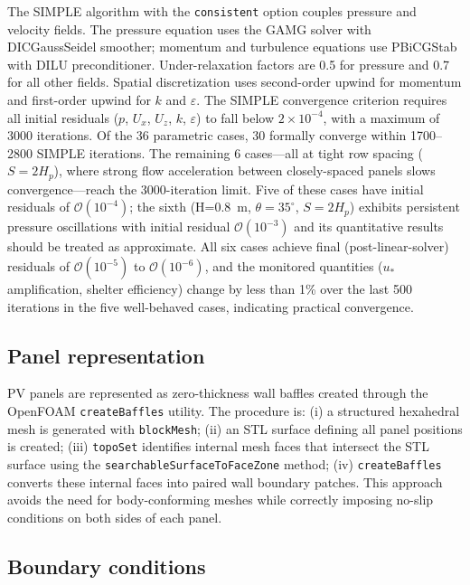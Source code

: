 \documentclass[preprint,12pt,review]{elsarticle}
\begin{document}
The SIMPLE algorithm \cite{patankar1980numerical} with the \texttt{consistent} option couples pressure and velocity fields. The pressure equation uses the GAMG solver with DICGaussSeidel smoother; momentum and turbulence equations use PBiCGStab with DILU preconditioner. Under-relaxation factors are 0.5 for pressure and 0.7 for all other fields. Spatial discretization uses second-order upwind for momentum and first-order upwind for $k$ and $\varepsilon$. The SIMPLE convergence criterion requires all initial residuals ($p$, $U_x$, $U_z$, $k$, $\varepsilon$) to fall below $2 \times 10^{-4}$, with a maximum of 3000 iterations. Of the 36 parametric cases, 30 formally converge within 1700--2800 SIMPLE iterations. The remaining 6 cases---all at tight row spacing ($S = 2H_p$), where strong flow acceleration between closely-spaced panels slows convergence---reach the 3000-iteration limit. Five of these cases have initial residuals of $\mathcal{O}(10^{-4})$; the sixth (H=0.8~m, $\theta=35^\circ$, $S=2H_p$) exhibits persistent pressure oscillations with initial residual $\mathcal{O}(10^{-3})$ and its quantitative results should be treated as approximate. All six cases achieve final (post-linear-solver) residuals of $\mathcal{O}(10^{-5})$ to $\mathcal{O}(10^{-6})$, and the monitored quantities ($u_*$ amplification, shelter efficiency) change by less than 1\% over the last 500 iterations in the five well-behaved cases, indicating practical convergence.

\subsection{Panel representation}

PV panels are represented as zero-thickness wall baffles created through the OpenFOAM \texttt{createBaffles} utility. The procedure is: (i) a structured hexahedral mesh is generated with \texttt{blockMesh}; (ii) an STL surface defining all panel positions is created; (iii) \texttt{topoSet} identifies internal mesh faces that intersect the STL surface using the \texttt{searchableSurfaceToFaceZone} method; (iv) \texttt{createBaffles} converts these internal faces into paired wall boundary patches. This approach avoids the need for body-conforming meshes while correctly imposing no-slip conditions on both sides of each panel.

\subsection{Boundary conditions}
\end{document}
